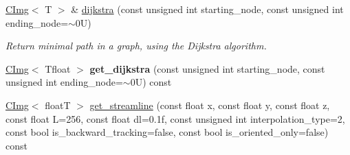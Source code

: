 \begin{DoxyCompactItemize}
\item 
\hypertarget{structcimg__library_1_1CImg_aaaf059b97f37c83ff892a761db3333b2}{
\hyperlink{structcimg__library_1_1CImg}{CImg}$<$ T $>$ \& \hyperlink{structcimg__library_1_1CImg_aaaf059b97f37c83ff892a761db3333b2}{dijkstra} (const unsigned int starting\_\-node, const unsigned int ending\_\-node=$\sim$0U)}
\label{structcimg__library_1_1CImg_aaaf059b97f37c83ff892a761db3333b2}

\begin{DoxyCompactList}\small\item\em Return minimal path in a graph, using the Dijkstra algorithm. \item\end{DoxyCompactList}\item 
\hypertarget{structcimg__library_1_1CImg_ae0ed498595ea1bfa2ad16b1feed6a38b}{
\hyperlink{structcimg__library_1_1CImg}{CImg}$<$ Tfloat $>$ {\bfseries get\_\-dijkstra} (const unsigned int starting\_\-node, const unsigned int ending\_\-node=$\sim$0U) const }
\label{structcimg__library_1_1CImg_ae0ed498595ea1bfa2ad16b1feed6a38b}

\item 
\hypertarget{structcimg__library_1_1CImg_a79487241e72e2dbef05c89d5f416a296}{
\hyperlink{structcimg__library_1_1CImg}{CImg}$<$ floatT $>$ \hyperlink{structcimg__library_1_1CImg_a79487241e72e2dbef05c89d5f416a296}{get\_\-streamline} (const float x, const float y, const float z, const float L=256, const float dl=0.1f, const unsigned int interpolation\_\-type=2, const bool is\_\-backward\_\-tracking=false, const bool is\_\-oriented\_\-only=false) const }
\label{structcimg__library_1_1CImg_a79487241e72e2dbef05c89d5f416a296}


\end{DoxyCompactItemize}
